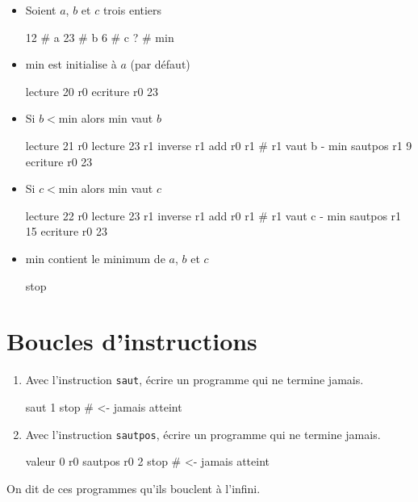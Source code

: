 \begin{correction}
  
\begin{itemize}
\item Soient $a$, $b$ et $c$ trois entiers
\begin{listing}{20}
12 # a    
23 # b
6  # c
?  # min
\end{listing}
\item $\text{min}$ est initialise à $a$ (par défaut)
\begin{listing}{1}
lecture 20 r0
ecriture r0 23
\end{listing}
\item Si $b < \text{min}$ alors $\text{min}$ vaut $b$
\begin{listing}{3}
lecture 21 r0
lecture 23 r1
inverse r1
add r0 r1    # r1 vaut b - min
sautpos r1 9 
ecriture r0 23
\end{listing}
\item Si $c < \text{min}$ alors $\text{min}$ vaut $c$
\begin{listing}{9}
lecture 22 r0
lecture 23 r1
inverse r1
add r0 r1 # r1 vaut c - min
sautpos r1 15
ecriture r0 23
\end{listing}
\item $\text{min}$ contient le minimum de $a$, $b$ et $c$ 
\begin{listing}{15}
stop
\end{listing}
\end{itemize}
\end{correction}

\section{Boucles d'instructions}

\begin{enumerate}
\item Avec l'instruction \verb|saut|, écrire un programme qui ne
  termine jamais.
\begin{correction}
\begin{listing}{1}
saut 1
stop # <- jamais atteint
\end{listing}
\end{correction}

\item Avec l'instruction \verb|sautpos|, écrire un programme qui ne termine jamais.
\begin{correction}
\begin{listing}{1}
valeur 0 r0
sautpos r0 2
stop # <- jamais atteint
\end{listing}    
\end{correction}
\end{enumerate}

On dit de ces programmes qu'ils bouclent à l'infini.

